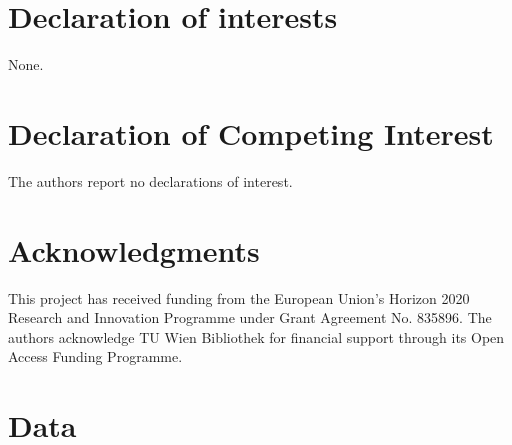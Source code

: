 \documentclass[review]{elsarticle}
\begin{document}






\section*{Declaration of interests}
None.
\section*{Declaration of Competing Interest}
The authors report no declarations of interest.
\section*{Acknowledgments}
This project has received funding from the European Union's Horizon 2020 Research and Innovation Programme under Grant Agreement No. 835896. The authors acknowledge TU Wien Bibliothek for financial support through its Open Access Funding Programme.


\appendix
\setcounter{table}{0}
\setcounter{figure}{0}
\section{Data}\label{app:data}
\begin{table}[h]
	\centering
	\caption{2020's economic parameters and empirical settings}
	\label{tab:a1}
\end{table}
\end{document}
